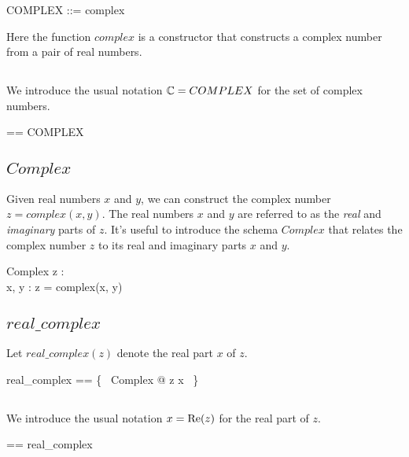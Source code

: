 \documentclass[11pt, oneside]{article}
\begin{document}
\begin{zed}
	COMPLEX ::= complex \ldata \R \cross \R \rdata
\end{zed}

Here the function $complex$ is a constructor that constructs a
complex number from a pair of real numbers.

\subsection{}

We introduce the usual notation $\mathbb{C} = COMPLEX$ for the set of complex numbers.

\begin{zed}
\C == COMPLEX
\end{zed}

\subsection{$Complex$}

Given real numbers $x$ and $y$, we can construct the complex number
$z = complex(x,y)$.
The real numbers $x$ and $y$ are referred to as the \textit{real} and \textit{imaginary} parts of $z$.
It's useful to introduce the schema $Complex$ that relates the complex number $z$ to its
real and imaginary parts $x$ and $y$.

\begin{schema}{Complex}
	z : \C \\
	x, y : \R
\where
	z = complex(x, y)
\end{schema}

\subsection{$real\_complex$}

Let $real\_complex(z)$ denote the real part $x$ of $z$.

\begin{zed}
	real\_complex == \{~ Complex @ z \mapsto x ~\}
\end{zed}

\subsection{}

We introduce the usual notation $x = \operatorname{Re}(z)$ for the real part of $z$.

\begin{zed}
	\realC == real\_complex
\end{zed}
\end{document}
